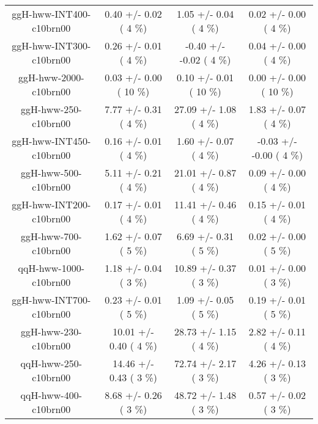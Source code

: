\begin{table}[h!]
\begin{center}
{\begin{tabular}{
c| c | c | c | }
 ggH-hww-INT400-c10brn00   &       0.40 +/-       0.02 (         4 \%)   &       1.05 +/-       0.04 (         4 \%)   &       0.02 +/-       0.00 (         4 \%)  \\
 ggH-hww-INT300-c10brn00   &       0.26 +/-       0.01 (         4 \%)   &      -0.40 +/-      -0.02 (         4 \%)   &       0.04 +/-       0.00 (         4 \%)  \\
 ggH-hww-2000-c10brn00   &       0.03 +/-       0.00 (        10 \%)   &       0.10 +/-       0.01 (        10 \%)   &       0.00 +/-       0.00 (        10 \%)  \\
 ggH-hww-250-c10brn00   &       7.77 +/-       0.31 (         4 \%)   &      27.09 +/-       1.08 (         4 \%)   &       1.83 +/-       0.07 (         4 \%)  \\
 ggH-hww-INT450-c10brn00   &       0.16 +/-       0.01 (         4 \%)   &       1.60 +/-       0.07 (         4 \%)   &      -0.03 +/-      -0.00 (         4 \%)  \\
 ggH-hww-500-c10brn00   &       5.11 +/-       0.21 (         4 \%)   &      21.01 +/-       0.87 (         4 \%)   &       0.09 +/-       0.00 (         4 \%)  \\
 ggH-hww-INT200-c10brn00   &       0.17 +/-       0.01 (         4 \%)   &      11.41 +/-       0.46 (         4 \%)   &       0.15 +/-       0.01 (         4 \%)  \\
 ggH-hww-700-c10brn00   &       1.62 +/-       0.07 (         5 \%)   &       6.69 +/-       0.31 (         5 \%)   &       0.02 +/-       0.00 (         5 \%)  \\
 qqH-hww-1000-c10brn00   &       1.18 +/-       0.04 (         3 \%)   &      10.89 +/-       0.37 (         3 \%)   &       0.01 +/-       0.00 (         3 \%)  \\
 ggH-hww-INT700-c10brn00   &       0.23 +/-       0.01 (         5 \%)   &       1.09 +/-       0.05 (         5 \%)   &       0.19 +/-       0.01 (         5 \%)  \\
 ggH-hww-230-c10brn00   &      10.01 +/-       0.40 (         4 \%)   &      28.73 +/-       1.15 (         4 \%)   &       2.82 +/-       0.11 (         4 \%)  \\
 qqH-hww-250-c10brn00   &      14.46 +/-       0.43 (         3 \%)   &      72.74 +/-       2.17 (         3 \%)   &       4.26 +/-       0.13 (         3 \%)  \\
 qqH-hww-400-c10brn00   &       8.68 +/-       0.26 (         3 \%)   &      48.72 +/-       1.48 (         3 \%)   &       0.57 +/-       0.02 (         3 \%)  \\

\end{tabular}}
\end{center}
\end{table}
